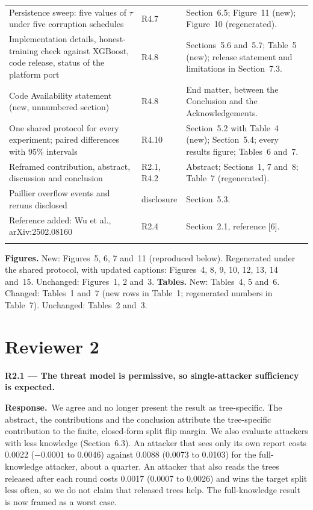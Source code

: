 \documentclass[11pt]{article}
\newcommand{\point}[1]{\par\medskip\noindent\textbf{\textcolor{blue!50!black}{#1}}\par}
\newcommand{\reply}{\noindent\textbf{Response.}\ }
\begin{document}
\begin{longtable}{>{\raggedright\arraybackslash}p{4.1cm}>{\raggedright\arraybackslash}p{1.7cm}>{\raggedright\arraybackslash}p{9.1cm}}
\addlinespace
Persistence sweep: five values of $\tau$ under five corruption schedules & R4.7 & Section~6.5; Figure~11 (new); Figure~10 (regenerated). \\
\addlinespace
Implementation details, honest-training check against XGBoost, code release, status of the platform port & R4.8 & Sections~5.6 and~5.7; Table~5 (new); release statement and limitations in Section~7.3. \\
\addlinespace
Code Availability statement (new, unnumbered section) & R4.8 & End matter, between the Conclusion and the Acknowledgements. \\
\addlinespace
One shared protocol for every experiment; paired differences with 95\% intervals & R4.10 & Section~5.2 with Table~4 (new); Section~5.4; every results figure; Tables~6 and~7. \\
\addlinespace
Reframed contribution, abstract, discussion and conclusion & R2.1, R4.2 & Abstract; Sections~1, 7 and~8; Table~7 (regenerated). \\
\addlinespace
Paillier overflow events and reruns disclosed & disclosure & Section~5.3. \\
\addlinespace
Reference added: Wu et al., arXiv:2502.08160 & R2.4 & Section~2.1, reference [6]. \\
\addlinespace
\bottomrule
\end{longtable}
\normalsize

\textbf{Figures.} New: Figures~5, 6, 7 and~11 (reproduced below). Regenerated under the shared protocol, with updated captions: Figures~4, 8, 9, 10, 12, 13, 14 and~15. Unchanged: Figures~1, 2 and~3.
\textbf{Tables.} New: Tables~4, 5 and~6. Changed: Tables~1 and~7 (new rows in Table~1; regenerated numbers in Table~7). Unchanged: Tables~2 and~3.

\section*{Reviewer 2}

\point{R2.1 --- The threat model is permissive, so single-attacker sufficiency is expected.}
\reply We agree and no longer present the result as tree-specific. The abstract, the contributions and the conclusion attribute the tree-specific contribution to the finite, closed-form split flip margin. We also evaluate attackers with less knowledge (Section~6.3). An attacker that sees only its own report costs 0.0022 ($-0.0001$ to 0.0046) against 0.0088 (0.0073 to 0.0103) for the full-knowledge attacker, about a quarter. An attacker that also reads the trees released after each round costs 0.0017 (0.0007 to 0.0026) and wins the target split less often, so we do not claim that released trees help. The full-knowledge result is now framed as a worst case.
\end{document}
